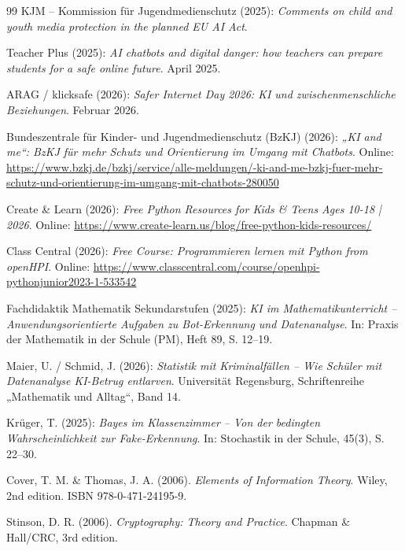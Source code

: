 \documentclass[12pt,a4paper,oneside]{scrartcl}
\begin{document}
\begin{thebibliography}{99}
		KJM – Kommission für Jugendmedienschutz (2025): \emph{Comments on child and youth media protection in the planned EU AI Act}.
		
		Teacher Plus (2025): \emph{AI chatbots and digital danger: how teachers can prepare students for a safe online future}. April 2025.
		
		ARAG / klicksafe (2026): \emph{Safer Internet Day 2026: KI und zwischenmenschliche Beziehungen}. Februar 2026.
		
		Bundeszentrale für Kinder- und Jugendmedienschutz (BzKJ) (2026): \emph{„KI and me“: BzKJ für mehr Schutz und Orientierung im Umgang mit Chatbots}. Online: \url{https://www.bzkj.de/bzkj/service/alle-meldungen/-ki-and-me-bzkj-fuer-mehr-schutz-und-orientierung-im-umgang-mit-chatbots-280050}
		
		Create \& Learn (2026): \emph{Free Python Resources for Kids \& Teens Ages 10-18 | 2026}. Online: \url{https://www.create-learn.us/blog/free-python-kids-resources/}
		
		Class Central (2026): \emph{Free Course: Programmieren lernen mit Python from openHPI}. Online: \url{https://www.classcentral.com/course/openhpi-pythonjunior2023-1-533542}
		
		Fachdidaktik Mathematik Sekundarstufen (2025): \emph{KI im Mathematikunterricht – Anwendungsorientierte Aufgaben zu Bot-Erkennung und Datenanalyse}. In: Praxis der Mathematik in der Schule (PM), Heft 89, S. 12–19.
		
		Maier, U. / Schmid, J. (2026): \emph{Statistik mit Kriminalfällen – Wie Schüler mit Datenanalyse KI-Betrug entlarven}. Universität Regensburg, Schriftenreihe „Mathematik und Alltag“, Band 14.
		
		Krüger, T. (2025): \emph{Bayes im Klassenzimmer – Von der bedingten Wahrscheinlichkeit zur Fake-Erkennung}. In: Stochastik in der Schule, 45(3), S. 22–30.
		
		Cover, T. M. \& Thomas, J. A. (2006). \textit{Elements of Information Theory}. Wiley, 2nd edition. ISBN 978-0-471-24195-9.
		
		Stinson, D. R. (2006). \textit{Cryptography: Theory and Practice}. Chapman \& Hall/CRC, 3rd edition.
		

\end{thebibliography}
\end{document}

